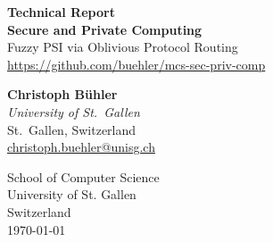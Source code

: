 \begin{titlepage}
	\begin{center}
		\vspace*{1cm}

		\Huge
		\textbf{Technical Report \\ Secure and Private Computing} \\
		Fuzzy PSI via Oblivious Protocol Routing \\
		\vspace{1em}
		\normalsize
		\href{https://github.com/buehler/mcs-sec-priv-comp}{https://github.com/buehler/mcs-sec-priv-comp}

		\vspace{2em}
		\Large

		\textbf{Christoph Bühler} \\
		\textit{University of St.\ Gallen} \\
		St.\ Gallen, Switzerland \\
		\href{mailto:christoph.buehler@unisg.ch}{christoph.buehler@unisg.ch}

		\vfill

		\Large
		School of Computer Science\\
		University of St. Gallen\\
		Switzerland\\
		\today

	\end{center}
\end{titlepage}
